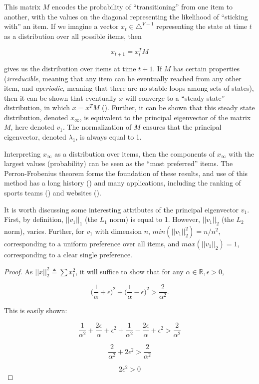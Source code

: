 This matrix $M$ encodes the probability of ``transitioning'' from one item to another, with the values on the diagonal representing the likelihood of ``sticking with'' an item. 
If we imagine a vector $x_t \in \triangle^{V-1}$ representing the state at time $t$ as a distribution over all possible items, then

\[
x_{t+1} = x_t^TM
\]

gives us the distribution over items at time $t+1$.
If $M$ has certain properties (\textit{irreducible}, meaning that any item can be eventually reached from any other item, and \textit{aperiodic}, meaning that there are no stable loops among sets of states), then it can be shown that eventually $x$ will converge to a ``steady state'' distribution, in which $x = x^TM$ (\cite{lin:2016}).
Further, it can be shown that this steady state distribution, denoted $x_{\infty}$, is equivalent to the principal eigenvector of the matrix $M$, here denoted $v_1$.
The normalization of $M$ ensures that the principal eigenvector, denoted $\lambda_1$, is always equal to 1.

Interpreting $x_{\infty}$ as a distribution over items, then the components of $x_{\infty}$ with the largest values (probability) can be seen as the ``most preferred'' items.
The Perron-Frobenius theorem forms the foundation of these results, and use of this method has a long history (\cite{keener:1993}) and many applications, including the ranking of sports teams (\cite{landau:1915}) and websites (\cite{brin}).

\bigskip

It is worth discussing some interesting attributes of the principal eigenvector $v_1$.
First, by definition, $||v_1||_1$ (the $L_1$ norm) is equal to 1.
However, $||v_1||_2$ (the $L_2$ norm), varies.
Further, for $v_1$ with dimension $n$, $min(||v_1||_2^2) = n/n^2$, corresponding to a uniform preference over all items, and $max(||v_1||_2) = 1$, corresponding to a clear single preference.

\begin{proof}
As $||x||_2^2 \triangleq \sum x_i^2$, it will suffice to show that for any $\alpha \in \mathbb{R}, \epsilon > 0$,

\[
\bigg(\frac{1}{\alpha} + \epsilon\bigg)^2
+ \bigg(\frac{1}{\alpha} - \epsilon\bigg)^2
> \frac{2}{\alpha^2}.
\]

This is easily shown:

\[
\frac{1}{\alpha^2} + \frac{2\epsilon}{\alpha} + \epsilon^2
+ \frac{1}{\alpha^2} - \frac{2\epsilon}{\alpha} + \epsilon^2
 > \frac{2}{\alpha^2}
\]

\[
\frac{2}{\alpha^2} + 2\epsilon^2
 > \frac{2}{\alpha^2}
\]

\[
2\epsilon^2 > 0
\]
\end{proof}

